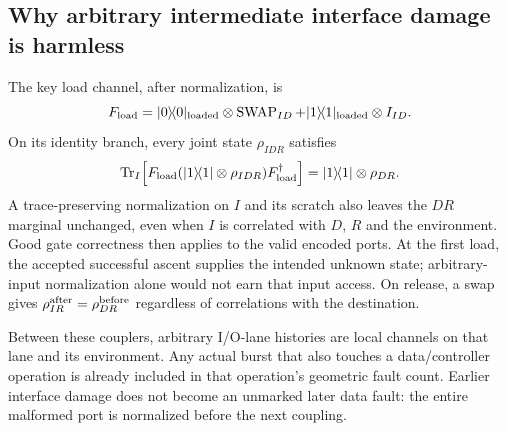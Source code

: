 \documentclass[11pt]{article}
\newcommand{\Tr}{\operatorname{Tr}}
\newcommand{\SWAP}{\operatorname{SWAP}}
\begin{document}
\subsection{Why arbitrary intermediate interface damage is harmless}

The key load channel, after normalization, is
\[
 F_{\rm load}
 =|0\rangle\!\langle0|_{\rm loaded}\otimes\SWAP_{ID}
  +|1\rangle\!\langle1|_{\rm loaded}\otimes I_{ID}.
\]
On its identity branch, every joint state $\rho_{IDR}$ satisfies
\[
 \Tr_I\!\left[
 F_{\rm load}(|1\rangle\!\langle1|\otimes\rho_{IDR})
 F_{\rm load}^{\dagger}\right]
 =|1\rangle\!\langle1|\otimes\rho_{DR}.
\]
A trace-preserving normalization on $I$ and its scratch also leaves the
$DR$ marginal unchanged, even when $I$ is correlated with $D$, $R$ and
the environment. Good gate correctness then applies to the valid encoded
ports. At the first load, the accepted successful ascent supplies the
intended unknown state; arbitrary-input normalization alone would not
earn that input access. On release, a swap gives
$\rho^{\rm after}_{IR}=\rho^{\rm before}_{DR}$ regardless of correlations
with the destination.

Between these couplers, arbitrary I/O-lane histories are local channels
on that lane and its environment. Any actual burst that also touches a
data/controller operation is already included in that operation's
geometric fault count. Earlier interface damage does not become an
unmarked later data fault: the entire malformed port is normalized
before the next coupling.
\end{document}
